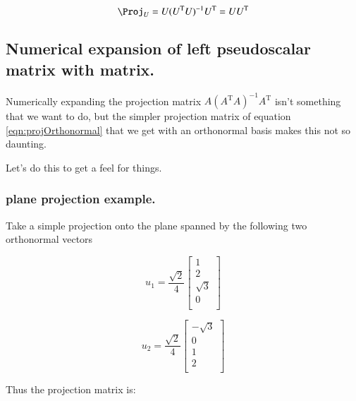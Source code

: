 \documentclass{article}      %
\newcommand{\T}[0]{{\text{T}}}
\begin{document}
\begin{equation}\label{eqn:projOrthonormal}
\Proj_U = U (U^\T U)^{-1} U^\T = U U^\T
\end{equation}

\subsection{ Numerical expansion of left pseudoscalar matrix with matrix.}

Numerically expanding the projection matrix $A (A^\T A)^{-1}A^\T$ isn't something
that we want to do, but the simpler projection matrix of equation
\ref{eqn:projOrthonormal} that we get with an orthonormal basis makes this not so daunting.

Let's do this to get a feel for things.

\subsubsection{  plane projection example. }

Take a simple projection onto the plane spanned by the following two orthonormal vectors

\[
u_1 = 
\frac{\sqrt{2}}{4}
\begin{bmatrix}
1 \\
2 \\
\sqrt{3} \\
0 \\
\end{bmatrix}
\]

\[
u_2 = 
\frac{\sqrt{2}}{4}
\begin{bmatrix}
-\sqrt{3} \\
0 \\
1 \\
2 \\
\end{bmatrix}
\]

Thus the projection matrix is:
\end{document}
